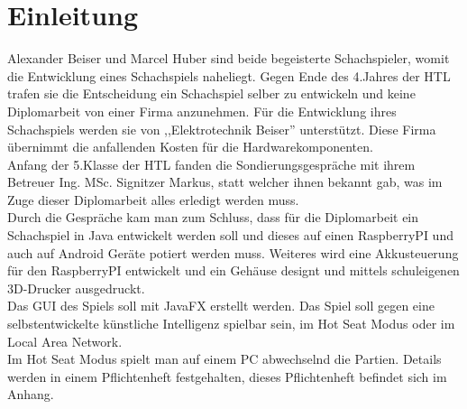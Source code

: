 \documentclass[12pt,a4paper]{article}
\newcommand{\cmnt}[1]{}			%
\newcommand{\yhbu}[0]{\color{ydkbu}}	%
\begin{document}
{%
\clearpage\vfill\newpage{}

\tableofcontents


\clearpage\vfill\newpage{}
\renewcommand{\thepage}{\arabic{page}}%
\renewcommand{\thesection}{\arabic{section}\;}
\setcounter{page}{1}
\setcounter{section}{0}
\section{\sc Einleitung}
\label{SEC:INTRODUCTION}

	Alexander Beiser und Marcel Huber sind beide begeisterte Schachspieler, womit die Entwicklung eines Schachspiels naheliegt. Gegen Ende des 4.Jahres der \ac{HTL} trafen sie die Entscheidung ein Schachspiel selber zu entwickeln und keine Diplomarbeit von einer Firma anzunehmen. Für die Entwicklung ihres Schachspiels werden sie von ,,Elektrotechnik Beiser'' unterstützt. Diese Firma übernimmt die anfallenden Kosten für die Hardwarekomponenten.\\
	Anfang der 5.Klasse der HTL fanden die Sondierungsgespräche mit ihrem Betreuer Ing. MSc. Signitzer Markus, statt 
welcher ihnen bekannt gab, was im Zuge dieser Diplomarbeit alles erledigt werden muss. \\
Durch die Gespräche kam man zum Schluss, dass für die Diplomarbeit ein Schachspiel in Java entwickelt werden soll und dieses auf einen RaspberryPI und auch auf Android Geräte potiert werden muss. Weiteres wird eine Akkusteuerung für den RaspberryPI entwickelt und ein Gehäuse designt und mittels schuleigenen 3D-Drucker ausgedruckt. \\
	Das  \acl{GUI} des Spiels soll mit JavaFX erstellt werden. Das Spiel soll gegen eine selbstentwickelte künstliche Intelligenz spielbar sein, im Hot Seat Modus oder im Local Area Network. \\
	Im Hot Seat Modus spielt man auf einem PC abwechselnd die Partien.
	Details werden in einem Pflichtenheft festgehalten, dieses Pflichtenheft befindet sich im Anhang.
	
\cmnt{
	{\yhbu
	In der Einleitung wird erklärt,
	wieso man sich für dieses Thema entschieden hat.
	(Zielsetzung und Aufgabenstellung des Gesamtprojekts,
	fachliches und wirtschaftliches Umfeld)
	}
	}
}
\end{document}
